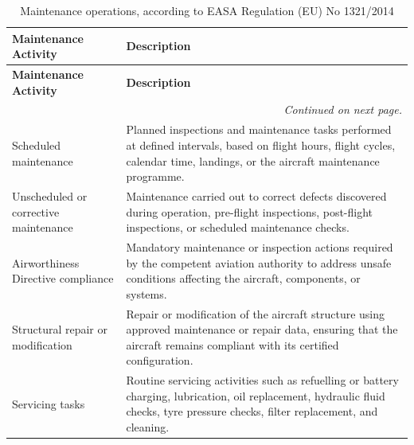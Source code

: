 \begin{longtable}{|p{}| p{}|}
\caption{Maintenance operations, according to EASA Regulation (EU) No 1321/2014 \cite{EASA_CAirworthiness}}
\label{maintenance_operation} \\

\hline
\textbf{Maintenance Activity} & \textbf{Description} \\
\hline\hline
\endfirsthead

\hline
\textbf{Maintenance Activity} & \textbf{Description} \\
\hline\hline
\endhead

\hline
\multicolumn{2}{r}{\textit{Continued on next page.}} \\
\endfoot

\hline
\endlastfoot

Scheduled maintenance &
Planned inspections and maintenance tasks performed at defined intervals, based on flight hours, flight cycles, calendar time, landings, or the aircraft maintenance programme. \\
\hline

Unscheduled or corrective maintenance &
Maintenance carried out to correct defects discovered during operation, pre-flight inspections, post-flight inspections, or scheduled maintenance checks. \\
\hline

Airworthiness Directive compliance &
Mandatory maintenance or inspection actions required by the competent aviation authority to address unsafe conditions affecting the aircraft, components, or systems. \\
\hline


Structural repair or modification &
Repair or modification of the aircraft structure using approved maintenance or repair data, ensuring that the aircraft remains compliant with its certified configuration. \\
\hline

Servicing tasks &
Routine servicing activities such as refuelling or battery charging, lubrication, oil replacement, hydraulic fluid checks, tyre pressure checks, filter replacement, and cleaning. \\
\hline


\end{longtable}
